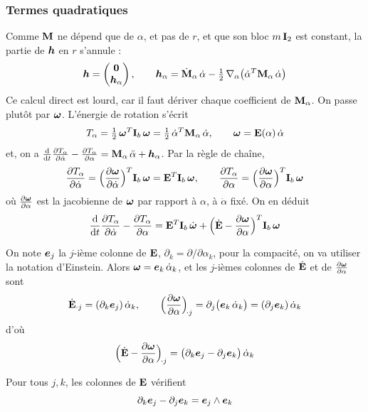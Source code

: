 \subsubsection{Termes quadratiques}

Comme $\mathbf{M}$ ne dépend que de $\alpha$, et pas de $r$, et que son
bloc $m\,\mathbf{I}_2$ est constant, la partie de $\bm{h}$ en $r$ s'annule :
\[
    \bm{h} = \begin{pmatrix} \bm{0}\\ \bm{h}_\alpha \end{pmatrix},
    \qquad
    \bm{h}_\alpha = \dot{\mathbf{M}}_\alpha\,\dot\alpha
    - \tfrac12\,\nabla_\alpha\bigl(\dot\alpha^T\mathbf{M}_\alpha\,\dot\alpha\bigr)
\]
Ce calcul direct est lourd, car il faut dériver chaque coefficient de
$\mathbf{M}_\alpha$. On passe plutôt par $\bm{\omega}$. L'énergie de
rotation s'écrit
\[
    T_\alpha = \tfrac12\,\bm{\omega}^T\mathbf{I}_b\,\bm{\omega}
    = \tfrac12\,\dot\alpha^T\mathbf{M}_\alpha\,\dot\alpha,
    \qquad
    \bm{\omega} = \mathbf{E}(\alpha)\,\dot\alpha
\]
et, on a
$\frac{\mathrm{d}}{\mathrm{d} t}\frac{\partial T_\alpha}{\partial \dot\alpha} - \frac{\partial T_\alpha}{\partial \alpha}
= \mathbf{M}_\alpha\,\ddot\alpha + \bm{h}_\alpha$. Par la règle de chaîne,
\[
    \frac{\partial T_\alpha}{\partial \dot\alpha}
    = \Bigl(\frac{\partial \bm{\omega}}{\partial \dot\alpha}\Bigr)^T\mathbf{I}_b\,\bm{\omega}
    = \mathbf{E}^T\mathbf{I}_b\,\bm{\omega},
    \qquad
    \frac{\partial T_\alpha}{\partial \alpha}
    = \Bigl(\frac{\partial \bm{\omega}}{\partial \alpha}\Bigr)^T\mathbf{I}_b\,\bm{\omega}
\]
où $\frac{\partial \bm{\omega}}{\partial \alpha}$ est la jacobienne de $\bm{\omega}$
par rapport à $\alpha$, à $\dot\alpha$ fixé. On en déduit
\[
    \frac{\mathrm{d}}{\mathrm{d} t}\frac{\partial T_\alpha}{\partial \dot\alpha} - \frac{\partial T_\alpha}{\partial \alpha}
    = \mathbf{E}^T\mathbf{I}_b\,\dot{\bm{\omega}}
    + \Bigl(\dot{\mathbf{E}} - \frac{\partial \bm{\omega}}{\partial \alpha}\Bigr)^T
    \mathbf{I}_b\,\bm{\omega}
\]

On note $\bm{e}_j$ la $j$-ième colonne de
$\mathbf{E}$, $\partial_k = \partial/\partial\alpha_k$, pour la compacité, on va utiliser la notation d'Einstein. Alors
$\bm{\omega} = \bm{e}_k\,\dot\alpha_k$, et les $j$-ièmes colonnes
de $\dot{\mathbf{E}}$ et de $\frac{\partial \bm{\omega}}{\partial \alpha}$ sont
\[
    \dot{\mathbf{E}}_{\cdot j} = (\partial_k\bm{e}_j)\,\dot\alpha_k,
    \qquad
    \Bigl(\frac{\partial \bm{\omega}}{\partial \alpha}\Bigr)_{\!\cdot j}
    = \partial_j\bigl(\bm{e}_k\,\dot\alpha_k\bigr)
    = (\partial_j\bm{e}_k)\,\dot\alpha_k
\]
d'où
\[
    \Bigl(\dot{\mathbf{E}} - \frac{\partial \bm{\omega}}{\partial \alpha}\Bigr)_{\!\cdot j}
    = \bigl(\partial_k\bm{e}_j - \partial_j\bm{e}_k\bigr)\,
    \dot\alpha_k
\]

\begin{proposition}
    Pour tous $j,k$, les colonnes de $\mathbf{E}$ vérifient
    \[
        \partial_k\bm{e}_j - \partial_j\bm{e}_k
        = \bm{e}_j\wedge\bm{e}_k
    \]
\end{proposition}

